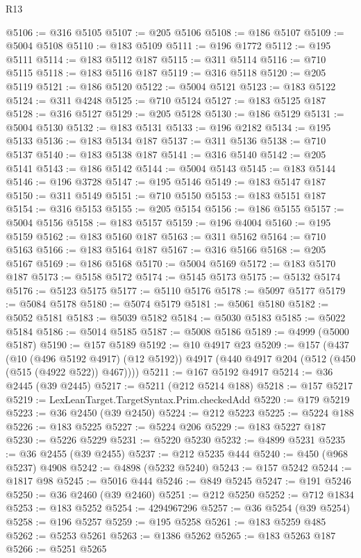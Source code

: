 \begin{lexlean}{R13}
\begin{coremodule}
@5106 := @316 @5105
@5107 := @205 @5106
@5108 := @186 @5107
@5109 := @5004 @5108
@5110 := @183 @5109
@5111 := @196 @1772
@5112 := @195 @5111
@5114 := @183 @5112 @187
@5115 := @311 @5114
@5116 := @710 @5115
@5118 := @183 @5116 @187
@5119 := @316 @5118
@5120 := @205 @5119
@5121 := @186 @5120
@5122 := @5004 @5121
@5123 := @183 @5122
@5124 := @311 @4248
@5125 := @710 @5124
@5127 := @183 @5125 @187
@5128 := @316 @5127
@5129 := @205 @5128
@5130 := @186 @5129
@5131 := @5004 @5130
@5132 := @183 @5131
@5133 := @196 @2182
@5134 := @195 @5133
@5136 := @183 @5134 @187
@5137 := @311 @5136
@5138 := @710 @5137
@5140 := @183 @5138 @187
@5141 := @316 @5140
@5142 := @205 @5141
@5143 := @186 @5142
@5144 := @5004 @5143
@5145 := @183 @5144
@5146 := @196 @3728
@5147 := @195 @5146
@5149 := @183 @5147 @187
@5150 := @311 @5149
@5151 := @710 @5150
@5153 := @183 @5151 @187
@5154 := @316 @5153
@5155 := @205 @5154
@5156 := @186 @5155
@5157 := @5004 @5156
@5158 := @183 @5157
@5159 := @196 @4004
@5160 := @195 @5159
@5162 := @183 @5160 @187
@5163 := @311 @5162
@5164 := @710 @5163
@5166 := @183 @5164 @187
@5167 := @316 @5166
@5168 := @205 @5167
@5169 := @186 @5168
@5170 := @5004 @5169
@5172 := @183 @5170 @187
@5173 := @5158 @5172
@5174 := @5145 @5173
@5175 := @5132 @5174
@5176 := @5123 @5175
@5177 := @5110 @5176
@5178 := @5097 @5177
@5179 := @5084 @5178
@5180 := @5074 @5179
@5181 := @5061 @5180
@5182 := @5052 @5181
@5183 := @5039 @5182
@5184 := @5030 @5183
@5185 := @5022 @5184
@5186 := @5014 @5185
@5187 := @5008 @5186
@5189 := @4999 (@5000 @5187)
@5190 := @157 @5189
@5192 := @10 @4917 @23
@5209 := @157
    (@437
      (@10 (@496 @5192 @4917) (@12 @5192))
      @4917
      (@440 @4917 @204 (@512 (@450 (@515 (@4922 @522)) @467))))
@5211 := @167 @5192 @4917
@5214 := @36 @2445 (@39 @2445)
@5217 := @5211 (@212 @5214 @188)
@5218 := @157 @5217
@5219 := LexLeanTarget.TargetSyntax.Prim.checkedAdd
@5220 := @179 @5219
@5223 := @36 @2450 (@39 @2450)
@5224 := @212 @5223
@5225 := @5224 @188
@5226 := @183 @5225
@5227 := @5224 @206
@5229 := @183 @5227 @187
@5230 := @5226 @5229
@5231 := @5220 @5230
@5232 := @4899 @5231
@5235 := @36 @2455 (@39 @2455)
@5237 := @212 @5235 @444
@5240 := @450 (@968 @5237) @4908
@5242 := @4898 (@5232 @5240)
@5243 := @157 @5242
@5244 := @1817 @98
@5245 := @5016 @444
@5246 := @849 @5245
@5247 := @191 @5246
@5250 := @36 @2460 (@39 @2460)
@5251 := @212 @5250
@5252 := @712 @1834
@5253 := @183 @5252
@5254 := 4294967296
@5257 := @36 @5254 (@39 @5254)
@5258 := @196 @5257
@5259 := @195 @5258
@5261 := @183 @5259 @485
@5262 := @5253 @5261
@5263 := @1386 @5262
@5265 := @183 @5263 @187
@5266 := @5251 @5265

\end{coremodule}
\end{lexlean}
